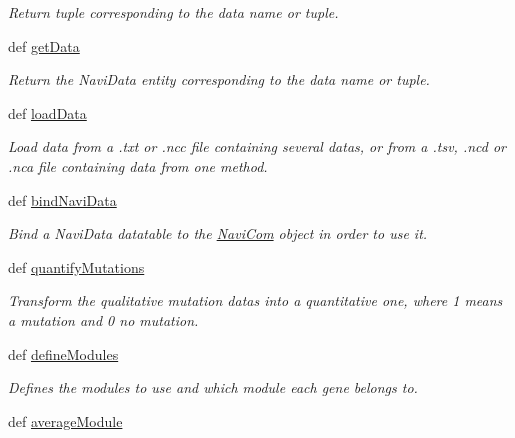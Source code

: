 \begin{DoxyCompactItemize}
\begin{DoxyCompactList}\small\item\em Return tuple corresponding to the data name or tuple. \item\end{DoxyCompactList}\item 
def \hyperlink{classnavicom_1_1navicom_1_1NaviCom_ad675e899836271ff4f2fd4bd17ea81d9}{getData}
\begin{DoxyCompactList}\small\item\em Return the NaviData entity corresponding to the data name or tuple. \item\end{DoxyCompactList}\item 
def \hyperlink{classnavicom_1_1navicom_1_1NaviCom_a10e8b8a4c06b4ecf09366ca6b69efff6}{loadData}
\begin{DoxyCompactList}\small\item\em Load data from a .txt or .ncc file containing several datas, or from a .tsv, .ncd or .nca file containing data from one method. \item\end{DoxyCompactList}\item 
def \hyperlink{classnavicom_1_1navicom_1_1NaviCom_ae310adb1d4e8932f0b72b6d8b6ca6301}{bindNaviData}
\begin{DoxyCompactList}\small\item\em Bind a NaviData datatable to the \hyperlink{classnavicom_1_1navicom_1_1NaviCom}{NaviCom} object in order to use it. \item\end{DoxyCompactList}\item 
def \hyperlink{classnavicom_1_1navicom_1_1NaviCom_a5314c49d6b9749693519a4a86cbfde71}{quantifyMutations}
\begin{DoxyCompactList}\small\item\em Transform the qualitative mutation datas into a quantitative one, where 1 means a mutation and 0 no mutation. \item\end{DoxyCompactList}\item 
def \hyperlink{classnavicom_1_1navicom_1_1NaviCom_a6411b52971f15bd11270942cb98eaa1a}{defineModules}
\begin{DoxyCompactList}\small\item\em Defines the modules to use and which module each gene belongs to. \item\end{DoxyCompactList}\item 
\hypertarget{classnavicom_1_1navicom_1_1NaviCom_afd1a299b687bc97e171cff0a738b7b73}{
def \hyperlink{classnavicom_1_1navicom_1_1NaviCom_afd1a299b687bc97e171cff0a738b7b73}{averageModule}}
\label{classnavicom_1_1navicom_1_1NaviCom_afd1a299b687bc97e171cff0a738b7b73}


\end{DoxyCompactItemize}
